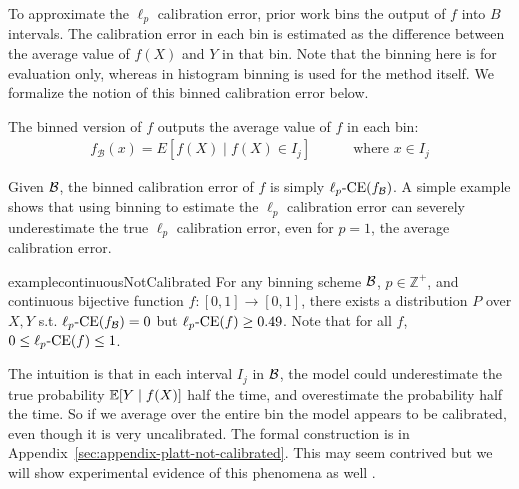 To approximate the $\ell_p$ calibration error, prior work bins the output of $f$ into $B$ intervals.
The calibration error in each bin is estimated as the difference between the average value of $f(X)$ and $Y$ in that bin.
Note that the binning here is for evaluation only, whereas in histogram binning is used for the  method itself.
We formalize the notion of this binned calibration error below.


\begin{definition}
The binned version of $f$ outputs the average value of $f$ in each bin:
\begin{align}
f_{\mathcal{B}}(x) = E[f(X) \mid f(X) \in I_j] \quad\quad\quad \mbox{where }x \in I_j
\end{align} 
\end{definition}

Given $\mathcal{B}{}$, the binned calibration error of $f$ is simply $\ell_p\mbox{-CE}(f_{\mathcal{B}{}})$.
A simple example shows that using binning to estimate the $\ell_p$ calibration error can severely underestimate the true $\ell_p$ calibration error, even for $p=1$, the average calibration error.

\begin{restatable}{example}{continuousNotCalibrated}
\label{ex:continuous-not-calibrated}
For any binning scheme $\mathcal{B}{}$, $p \in \mathbb{Z}^+$, and continuous bijective function $f : [0, 1] \to [0, 1]$, there exists a distribution $P$ over $X, Y$ s.t. $\ell_p\mbox{-CE}(f_{\mathcal{B}{}}) = 0$ but $\ell_p\mbox{-CE}(f) \geq 0.49$.
Note that for all $f$, $0 \leq \ell_p\mbox{-CE}(f) \leq 1$.
\end{restatable}

The intuition is that in each interval $I_j$ in $\mathcal{B}{}$, the model could underestimate the true probability $\mathbb{E}[Y \mid f(X)]$ half the time, and overestimate the probability half the time. So if we average over the entire bin the model appears to be calibrated, even though it is very uncalibrated. The formal construction is in Appendix~\ref{sec:appendix-platt-not-calibrated}. This may seem contrived but we will show experimental evidence of this phenomena as well .

